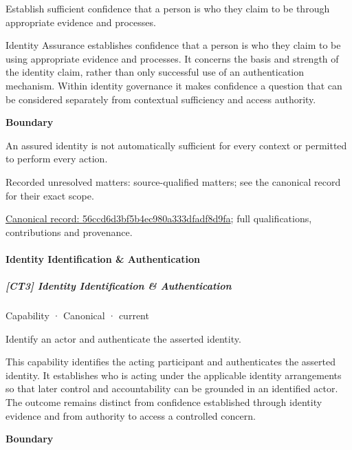 Establish sufficient confidence that a person is who they claim to be through appropriate evidence and processes.



Identity Assurance establishes confidence that a person is who they claim to be using appropriate evidence and processes. It concerns the basis and strength of the identity claim, rather than only successful use of an authentication mechanism. Within identity governance it makes confidence a question that can be considered separately from contextual sufficiency and access authority.



\textbf{Boundary}



An assured identity is not automatically sufficient for every context or permitted to perform every action.


{\small Recorded unresolved matters: source-qualified matters; see the canonical record for their exact scope.}\par
{\footnotesize \href{../../../../continuum/strategy/capability/56ccd6d3bf5b4ec980a333dfadf8d9fa.md}{Canonical record: 56ccd6d3bf5b4ec980a333dfadf8d9fa}; full qualifications, contributions and provenance.}\par
\paragraph{Identity Identification \& Authentication}

\subparagraph{[CT3] Identity Identification \& Authentication}

\label{element:ba4ad62548984d63ad75da3561566431}
{\small Capability · Canonical · current}\par

Identify an actor and authenticate the asserted identity.



This capability identifies the acting participant and authenticates the asserted identity. It establishes who is acting under the applicable identity arrangements so that later control and accountability can be grounded in an identified actor. The outcome remains distinct from confidence established through identity evidence and from authority to access a controlled concern.



\textbf{Boundary}



